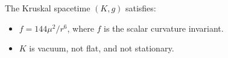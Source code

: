 The Kruskal spacetime $(K, g)$ satisfies:
\begin{itemize}
\item[(a)] $f = 144\mu^2/r^6$, where $f$ is the scalar curvature invariant.
\item[(b)] $K$ is vacuum, not flat, and not stationary.
\end{itemize}
